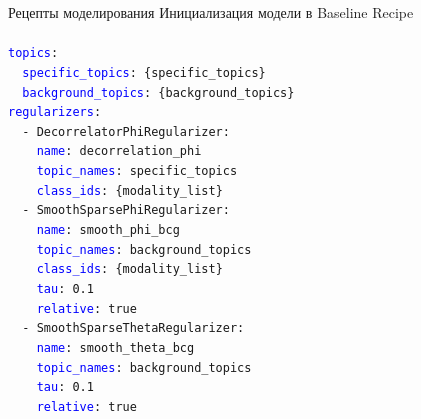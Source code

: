 \begin{frame}[t]{Рецепты моделирования}
Инициализация модели в Baseline Recipe\\

\footnotesize \texttt{\\
\textcolor{blue}{topics}: \\
\ \ \textcolor{blue}{specific\_topics}: \colorbox{gray!30}{\{specific\_topics\}} \\
\ \     \textcolor{blue}{background\_topics}: \colorbox{gray!30}{\{background\_topics\}} \\
\textcolor{blue}{regularizers}: \\
\ \ - DecorrelatorPhiRegularizer: \\
\ \ \ \ \textcolor{blue}{name}: decorrelation\_phi \\
\ \ \ \ \textcolor{blue}{topic\_names}: specific\_topics \\
\ \ \ \ \textcolor{blue}{class\_ids}: \colorbox{gray!30}{\{modality\_list\}} \\
\ \ - SmoothSparsePhiRegularizer: \\
\ \ \ \ \textcolor{blue}{name}: smooth\_phi\_bcg \\
\ \ \ \ \textcolor{blue}{topic\_names}: background\_topics \\
\ \ \ \ \textcolor{blue}{class\_ids}: \colorbox{gray!30}{\{modality\_list\}} \\
\ \ \ \ \textcolor{blue}{tau}: 0.1 \\
\ \ \ \ \textcolor{blue}{relative}: true \\
\ \ - SmoothSparseThetaRegularizer: \\
\ \ \ \ \textcolor{blue}{name}: smooth\_theta\_bcg \\
\ \ \ \ \textcolor{blue}{topic\_names}: background\_topics \\
\ \ \ \ \textcolor{blue}{tau}: 0.1 \\
\ \ \ \ \textcolor{blue}{relative}: true \\
}

\end{frame}

